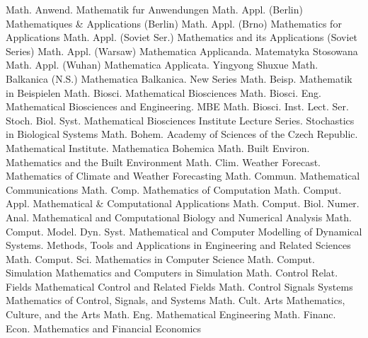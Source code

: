 {Math. Anwend.}
{Mathematik fur Anwendungen}
{Math. Appl. (Berlin)}
{Mathematiques & Applications (Berlin)}
{Math. Appl. (Brno)}
{Mathematics for Applications}
{Math. Appl. (Soviet Ser.)}
{Mathematics and its Applications (Soviet Series)}
{Math. Appl. (Warsaw)}
{Mathematica Applicanda. Matematyka Stosowana}
{Math. Appl. (Wuhan)}
{Mathematica Applicata. Yingyong Shuxue}
{Math. Balkanica (N.S.)}
{Mathematica Balkanica. New Series}
{Math. Beisp.}
{Mathematik in Beispielen}
{Math. Biosci.}
{Mathematical Biosciences}
{Math. Biosci. Eng.}
{Mathematical Biosciences and Engineering. MBE}
{Math. Biosci. Inst. Lect. Ser. Stoch. Biol. Syst.}
{Mathematical Biosciences Institute Lecture Series. Stochastics in Biological Systems}
{Math. Bohem.}
{Academy of Sciences of the Czech Republic. Mathematical Institute. Mathematica Bohemica}
{Math. Built Environ.}
{Mathematics and the Built Environment}
{Math. Clim. Weather Forecast.}
{Mathematics of Climate and Weather Forecasting}
{Math. Commun.}
{Mathematical Communications}
{Math. Comp.}
{Mathematics of Computation}
{Math. Comput. Appl.}
{Mathematical & Computational Applications}
{Math. Comput. Biol. Numer. Anal.}
{Mathematical and Computational Biology and Numerical Analysis}
{Math. Comput. Model. Dyn. Syst.}
{Mathematical and Computer Modelling of Dynamical Systems. Methods, Tools and Applications in Engineering and Related Sciences}
{Math. Comput. Sci.}
{Mathematics in Computer Science}
{Math. Comput. Simulation}
{Mathematics and Computers in Simulation}
{Math. Control Relat. Fields}
{Mathematical Control and Related Fields}
{Math. Control Signals Systems}
{Mathematics of Control, Signals, and Systems}
{Math. Cult. Arts}
{Mathematics, Culture, and the Arts}
{Math. Eng.}
{Mathematical Engineering}
{Math. Financ. Econ.}
{Mathematics and Financial Economics}
